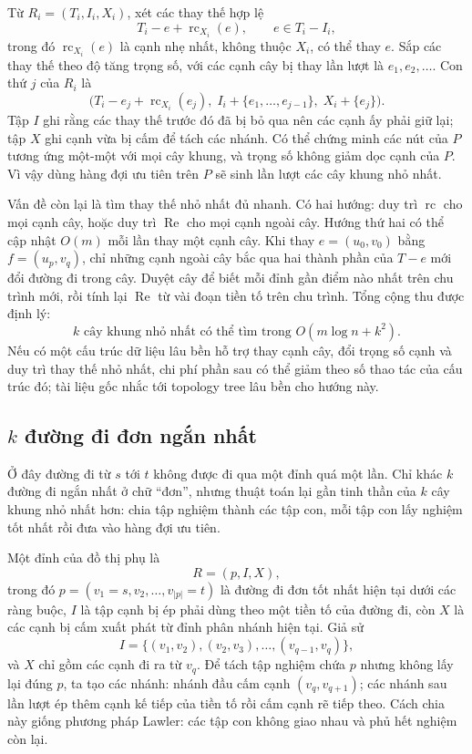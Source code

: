 \documentclass[11pt]{article}
\begin{document}
Từ \(R_i=(T_i,I_i,X_i)\), xét các thay thế hợp lệ
\[
  T_i-e+\operatorname{rc}_{X_i}(e),
  \qquad e\in T_i-I_i,
\]
trong đó \(\operatorname{rc}_{X_i}(e)\) là cạnh nhẹ nhất, không thuộc \(X_i\),
có thể thay \(e\). Sắp các thay thế theo độ tăng trọng số, với các cạnh cây bị
thay lần lượt là \(e_1,e_2,\ldots\). Con thứ \(j\) của \(R_i\) là
\[
  \bigl(T_i-e_j+\operatorname{rc}_{X_i}(e_j),\;
        I_i+\{e_1,\ldots,e_{j-1}\},\;
        X_i+\{e_j\}\bigr).
\]
Tập \(I\) ghi rằng các thay thế trước đó đã bị bỏ qua nên các cạnh ấy phải giữ
lại; tập \(X\) ghi cạnh vừa bị cấm để tách các nhánh. Có thể chứng minh các
nút của \(P\) tương ứng một-một với mọi cây khung, và trọng số không giảm dọc
cạnh của \(P\). Vì vậy dùng hàng đợi ưu tiên trên \(P\) sẽ sinh lần lượt các
cây khung nhỏ nhất.

Vấn đề còn lại là tìm thay thế nhỏ nhất đủ nhanh. Có hai hướng: duy trì
\(\operatorname{rc}\) cho mọi cạnh cây, hoặc duy trì \(\operatorname{Re}\) cho
mọi cạnh ngoài cây. Hướng thứ hai có thể cập nhật \(O(m)\) mỗi lần thay một
cạnh cây. Khi thay \(e=(u_0,v_0)\) bằng \(f=(u_p,v_q)\), chỉ những cạnh ngoài
cây bắc qua hai thành phần của \(T-e\) mới đổi đường đi trong cây. Duyệt cây để
biết mỗi đỉnh gần điểm nào nhất trên chu trình mới, rồi tính lại
\(\operatorname{Re}\) từ vài đoạn tiền tố trên chu trình. Tổng cộng thu được
định lý:
\[
  \text{\(k\) cây khung nhỏ nhất có thể tìm trong }O(m\log n+k^2).
\]
Nếu có một cấu trúc dữ liệu lâu bền hỗ trợ thay cạnh cây, đổi trọng số cạnh và
duy trì thay thế nhỏ nhất, chi phí phần sau có thể giảm theo số thao tác của
cấu trúc đó; tài liệu gốc nhắc tới topology tree lâu bền cho hướng này.

\subsection{\texorpdfstring{\(k\)}{k} đường đi đơn ngắn nhất}

Ở đây đường đi từ \(s\) tới \(t\) không được đi qua một đỉnh quá một lần. Chỉ
khác \(k\) đường đi ngắn nhất ở chữ ``đơn'', nhưng thuật toán lại gần tinh thần
của \(k\) cây khung nhỏ nhất hơn: chia tập nghiệm thành các tập con, mỗi tập
con lấy nghiệm tốt nhất rồi đưa vào hàng đợi ưu tiên.

Một đỉnh của đồ thị phụ là
\[
  R=(p,I,X),
\]
trong đó \(p=(v_1=s,v_2,\ldots,v_{|p|}=t)\) là đường đi đơn tốt nhất hiện tại
dưới các ràng buộc, \(I\) là tập cạnh bị ép phải dùng theo một tiền tố của
đường đi, còn \(X\) là các cạnh bị cấm xuất phát từ đỉnh phân nhánh hiện tại.
Giả sử
\[
  I=\{(v_1,v_2),(v_2,v_3),\ldots,(v_{q-1},v_q)\},
\]
và \(X\) chỉ gồm các cạnh đi ra từ \(v_q\). Để tách tập nghiệm chứa \(p\) nhưng
không lấy lại đúng \(p\), ta tạo các nhánh: nhánh đầu cấm cạnh
\((v_q,v_{q+1})\); các nhánh sau lần lượt ép thêm cạnh kế tiếp của tiền tố rồi
cấm cạnh rẽ tiếp theo. Cách chia này giống phương pháp Lawler: các tập con
không giao nhau và phủ hết nghiệm còn lại.
\end{document}
